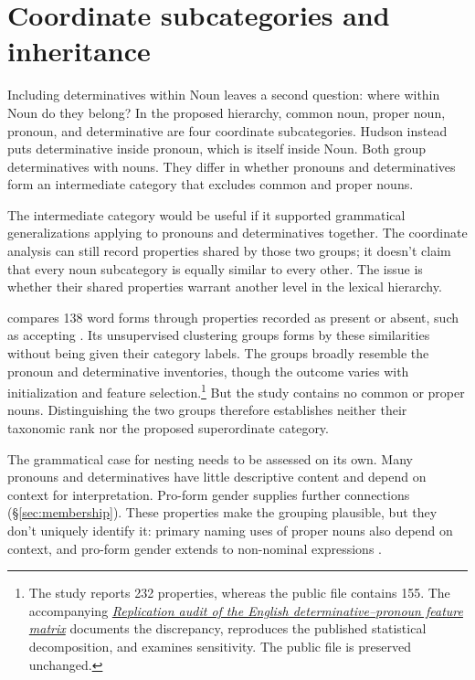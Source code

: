 \documentclass[12pt]{article}
\begin{document}
\section{Coordinate subcategories and inheritance}\label{sec:inheritance}

Including determinatives within Noun leaves a second question: where within Noun do they belong? In the proposed hierarchy, common noun, proper noun, pronoun, and determinative are four coordinate subcategories. Hudson instead puts determinative inside pronoun, which is itself inside Noun. Both group determinatives with nouns. They differ in whether pronouns and determinatives form an intermediate category that excludes common and proper nouns.

The intermediate category would be useful if it supported grammatical generalizations applying to pronouns and determinatives together. The coordinate analysis can still record properties shared by those two groups; it doesn't claim that every noun subcategory is equally similar to every other. The issue is whether their shared properties warrant another level in the lexical hierarchy.

\textcite{reynolds2021} compares 138 word forms through properties recorded as present or absent, such as accepting . Its unsupervised clustering groups forms by these similarities without being given their category labels. The groups broadly resemble the pronoun and determinative inventories, though the outcome varies with initialization and feature selection.\footnote{The study reports 232 properties, whereas the public file contains 155. The accompanying \href{run:matrix-audit.pdf}{\textit{Replication audit of the English determinative--pronoun feature matrix}} documents the discrepancy, reproduces the published statistical decomposition, and examines sensitivity. The public file is preserved unchanged.} But the study contains no common or proper nouns. Distinguishing the two groups therefore establishes neither their taxonomic rank nor the proposed superordinate category.

The grammatical case for nesting needs to be assessed on its own. Many pronouns and determinatives have little descriptive content and depend on context for interpretation. Pro-form gender supplies further connections (§\ref{sec:membership}). These properties make the grouping plausible, but they don't uniquely identify it: primary naming uses of proper nouns also depend on context, and pro-form gender extends to non-nominal expressions \citep{reynolds2025proformgender}.
\end{document}
